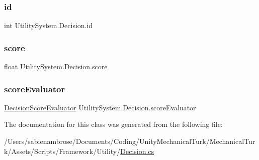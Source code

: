 \subsubsection{\texorpdfstring{id}{id}}
{\footnotesize\ttfamily int Utility\+System.\+Decision.\+id}

\mbox{\label{class_utility_system_1_1_decision_a26d318a50cfa8b16f3955ae814516b8d}} 
\subsubsection{\texorpdfstring{score}{score}}
{\footnotesize\ttfamily float Utility\+System.\+Decision.\+score}

\mbox{\label{class_utility_system_1_1_decision_aed761a6523b0eb1148c743665fa05789}} 
\subsubsection{\texorpdfstring{score\+Evaluator}{scoreEvaluator}}
{\footnotesize\ttfamily \mbox{\hyperlink{class_utility_system_1_1_decision_score_evaluator}{Decision\+Score\+Evaluator}} Utility\+System.\+Decision.\+score\+Evaluator}



The documentation for this class was generated from the following file\+:\begin{DoxyCompactItemize}
\item 
/\+Users/sabienambrose/\+Documents/\+Coding/\+Unity\+Mechanical\+Turk/\+Mechanical\+Turk/\+Assets/\+Scripts/\+Framework/\+Utility/\mbox{\hyperlink{_decision_8cs}{Decision.\+cs}}\end{DoxyCompactItemize}
